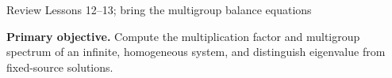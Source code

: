 \providecommand{\dd}{\,\mathrm{d}}
\AtBeginDocument{%
\setlength{\abovedisplayskip}{4pt plus 1pt minus 1pt}
\setlength{\belowdisplayskip}{4pt plus 1pt minus 1pt}
\setlength{\abovedisplayshortskip}{3pt plus 1pt}
\setlength{\belowdisplayshortskip}{3pt plus 1pt}
\setlength{\jot}{2pt}
}

  {Review Lessons 12--13; bring the multigroup balance equations}

\MakeHandoutTitle
\textcolor{KSUDeepPurple}{\textbf{Primary objective.}}
Compute the multiplication factor and multigroup spectrum of an
infinite, homogeneous system, and distinguish eigenvalue from fixed-source solutions.
\par\vspace{5pt}

